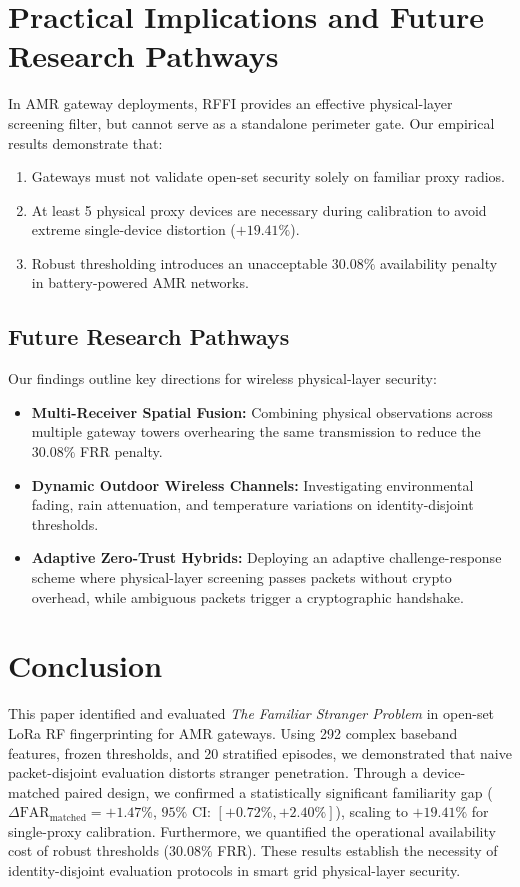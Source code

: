 \documentclass[conference]{IEEEtran}
\begin{document}
\section{Practical Implications and Future Research Pathways}
In AMR gateway deployments, RFFI provides an effective physical-layer screening filter, but cannot serve as a standalone perimeter gate. Our empirical results demonstrate that:
\begin{enumerate}
    \item Gateways must not validate open-set security solely on familiar proxy radios.
    \item At least 5 physical proxy devices are necessary during calibration to avoid extreme single-device distortion ($+19.41\%$).
    \item Robust thresholding introduces an unacceptable $30.08\%$ availability penalty in battery-powered AMR networks.
\end{enumerate}

\subsection{Future Research Pathways}
Our findings outline key directions for wireless physical-layer security:
\begin{itemize}
    \item \textbf{Multi-Receiver Spatial Fusion:} Combining physical observations across multiple gateway towers overhearing the same transmission to reduce the $30.08\%$ FRR penalty.
    \item \textbf{Dynamic Outdoor Wireless Channels:} Investigating environmental fading, rain attenuation, and temperature variations on identity-disjoint thresholds.
    \item \textbf{Adaptive Zero-Trust Hybrids:} Deploying an adaptive challenge-response scheme where physical-layer screening passes packets without crypto overhead, while ambiguous packets trigger a cryptographic handshake.
\end{itemize}

\section{Conclusion}
This paper identified and evaluated \textit{The Familiar Stranger Problem} in open-set LoRa RF fingerprinting for AMR gateways. Using 292 complex baseband features, frozen thresholds, and 20 stratified episodes, we demonstrated that naive packet-disjoint evaluation distorts stranger penetration. Through a device-matched paired design, we confirmed a statistically significant familiarity gap ($\Delta\text{FAR}_{\text{matched}} = +1.47\%$, $95\%$ CI: $[+0.72\%, +2.40\%]$), scaling to $+19.41\%$ for single-proxy calibration. Furthermore, we quantified the operational availability cost of robust thresholds ($30.08\%$ FRR). These results establish the necessity of identity-disjoint evaluation protocols in smart grid physical-layer security.



\end{document}
